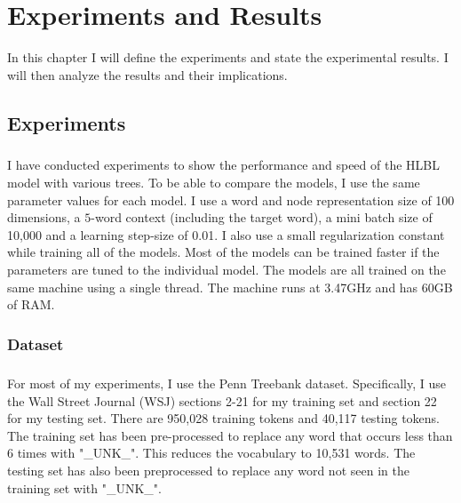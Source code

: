 \chapter{Experiments and Results}
In this chapter I will define the experiments and state the experimental results. I will then analyze the results and their implications.

\section{Experiments} \label{sec:experiments}
\paragraph{}
I have conducted experiments to show the performance and speed of the HLBL model with various trees. To be able to compare the models, I use the same parameter values for each model. I use a word and node representation size of 100 dimensions, a $5$-word context (including the target word), a mini batch size of 10,000 and a learning step-size of 0.01. I also use a small regularization constant while training all of the models. Most of the models can be trained faster if the parameters are tuned to the individual model. The models are all trained on the same machine using a single thread. The machine runs at 3.47GHz and has 60GB of RAM.

\subsection{Dataset}
\paragraph{}
For most of my experiments, I use the Penn Treebank dataset. Specifically, I use the Wall Street Journal (WSJ) sections 2-21 for my training set and section 22 for my testing set. There are 950,028 training tokens and 40,117 testing tokens. The training set has been pre-processed to replace any word that occurs less than 6 times with "\_UNK\_". This reduces the vocabulary to 10,531 words. The testing set has also been preprocessed to replace any word not seen in the training set with "\_UNK\_".




